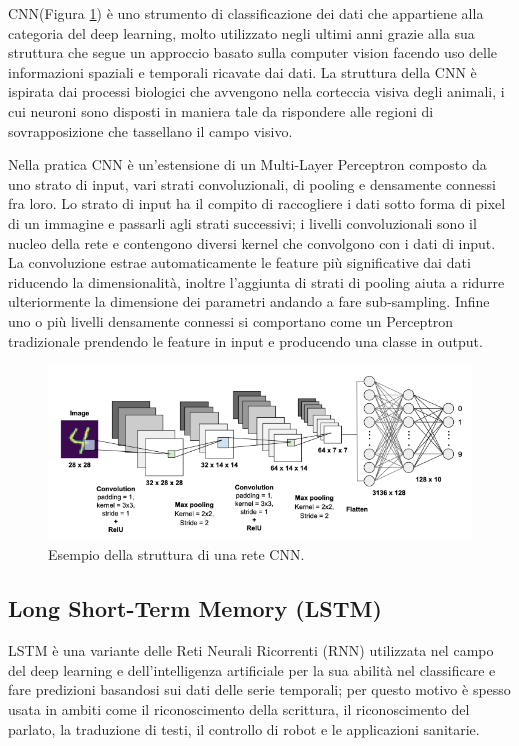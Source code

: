 CNN(Figura \ref{fig:cnn}) è uno strumento di classificazione dei dati che appartiene alla categoria del deep learning, molto utilizzato negli ultimi anni grazie alla sua struttura che segue un approccio basato sulla computer vision facendo uso delle informazioni spaziali e temporali ricavate dai dati. La struttura della CNN è ispirata dai processi biologici che avvengono nella corteccia visiva degli animali, i cui neuroni sono disposti in maniera tale da rispondere alle regioni di sovrapposizione che tassellano il campo visivo.

Nella pratica CNN è un'estensione di un Multi-Layer Perceptron composto da uno strato di input, vari strati convoluzionali, di pooling e densamente connessi fra loro. Lo strato di input ha il compito di raccogliere i dati sotto forma di pixel di un immagine e passarli agli strati successivi; i livelli convoluzionali sono il nucleo della rete e contengono diversi kernel che convolgono con i dati di input. La convoluzione estrae automaticamente le feature più significative dai dati riducendo la dimensionalità, inoltre l'aggiunta di strati di pooling aiuta a ridurre ulteriormente la dimensione dei parametri andando a fare sub-sampling. Infine uno o più livelli densamente connessi si comportano come un Perceptron tradizionale prendendo le feature in input e producendo una classe in output.

\begin{figure}[!htb]
    \centering
    \includegraphics[width=\textwidth]{figure/cnn.png}
    \caption{Esempio della struttura di una rete CNN.}
    \label{fig:cnn}
\end{figure}

\subsection{Long Short-Term Memory (LSTM)}
\label{ssec:long-short-term-memory}

LSTM è una variante delle Reti Neurali Ricorrenti (RNN) utilizzata nel campo del deep learning e dell'intelligenza artificiale per la sua abilità nel classificare e fare predizioni basandosi sui dati delle serie temporali; per questo motivo è spesso usata in ambiti come il riconoscimento della scrittura, il riconoscimento del parlato, la traduzione di testi, il controllo di robot e le applicazioni sanitarie.

